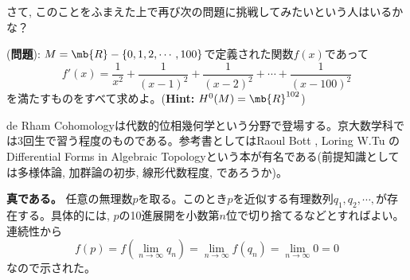 さて, このことをふまえた上で再び次の問題に挑戦してみたいという人はいるかな？

(\textbf{問題}): $M=\mb{R}-\{ 0,1,2,\cdots, 100 \}$で定義された関数$f(x)$であって
\[ f'(x) = \dfrac{1}{x^2} + \dfrac{1}{(x-1)^2} + \dfrac{1}{(x-2)^2 }+ \cdots + \dfrac{1}{(x-100)^2} \]
を満たすものをすべて求めよ。(\textbf{Hint:} $H^{0}(M) = \mb{R}^{102}$)

de Rham Cohomologyは代数的位相幾何学という分野で登場する。京大数学科では3回生で習う程度のものである。参考書としてはRaoul Bott , Loring W.Tu のDifferential Forms in Algebraic Topologyという本が有名である(前提知識としては多様体論, 加群論の初歩, 線形代数程度, であろうか)。

\textbf{真である。} 任意の無理数$p$を取る。このとき$p$を近似する有理数列$q_1,q_2,\cdots,$が存在する。具体的には, $p$の10進展開を小数第$n$位で切り捨てるなどとすればよい。連続性から
\[ f(p) =  f(\lim_{n\to \infty}q_n) = \lim_{n\to \infty} f(q_n) = \lim_{n\to \infty} 0 = 0 \]
なので示された。
